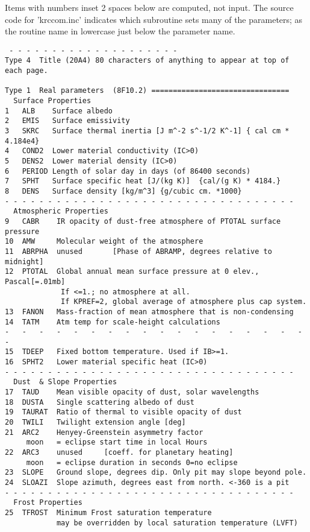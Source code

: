 \documentclass[draft]{article}  %
\begin{document}
Items with numbers inset 2 spaces below are computed, not input.                
The source code for 'krccom.inc' indicates which subroutine sets many of the 
parameters; as the routine name in lowercase just below the parameter name.
\vspace{-3.mm} 
\begin{verbatim}
 - - - - - - - - - - - - - - - - - - - -
Type 4	Title (20A4) 80 characters of anything to appear at top of each page.

Type 1	Real parameters  (8F10.2) ================================
  Surface Properties
1   ALB    Surface albedo
2   EMIS   Surface emissivity
3   SKRC   Surface thermal inertia [J m^-2 s^-1/2 K^-1] { cal cm * 4.184e4}
4   COND2  Lower material conductivity (IC>0)
5   DENS2  Lower material density (IC>0)
6   PERIOD Length of solar day in days (of 86400 seconds)
7   SPHT   Surface specific heat [J/(kg K)]  {cal/(g K) * 4184.}
8   DENS   Surface density [kg/m^3] {g/cubic cm. *1000}
- - - - - - - - - - - - - - - - - - - - - - - - - - - - - - - - - - 
  Atmospheric Properties
9   CABR    IR opacity of dust-free atmosphere of PTOTAL surface pressure
10  AMW     Molecular weight of the atmosphere
11  ABRPHA  unused       [Phase of ABRAMP, degrees relative to midnight] 
12  PTOTAL  Global annual mean surface pressure at 0 elev., Pascal[=.01mb]
             If <=1.; no atmosphere at all.
             If KPREF=2, global average of atmosphere plus cap system.
13  FANON   Mass-fraction of mean atmosphere that is non-condensing
14  TATM    Atm temp for scale-height calculations
-   -   -   -   -   -   -   -   -   -   -   -   -   -   -   -   -   -   -   
15  TDEEP   Fixed bottom temperature. Used if IB>=1.
16  SPHT2   Lower material specific heat (IC>0)
- - - - - - - - - - - - - - - - - - - - - - - - - - - - - - - - - - 
  Dust  & Slope Properties
17  TAUD    Mean visible opacity of dust, solar wavelengths
18  DUSTA   Single scattering albedo of dust
19  TAURAT  Ratio of thermal to visible opacity of dust
20  TWILI   Twilight extension angle [deg]
21  ARC2    Henyey-Greenstein asymmetry factor
     moon   = eclipse start time in local Hours
22  ARC3    unused     [coeff. for planetary heating] 
     moon   = eclipse duration in seconds 0=no eclipse
23  SLOPE   Ground slope, degrees dip. Only pit may slope beyond pole.
24  SLOAZI  Slope azimuth, degrees east from north. <-360 is a pit
- - - - - - - - - - - - - - - - - - - - - - - - - - - - - - - - - - 
  Frost Properties
25  TFROST  Minimum Frost saturation temperature
            may be overridden by local saturation temperature (LVFT)

\end{verbatim}
\end{document}
